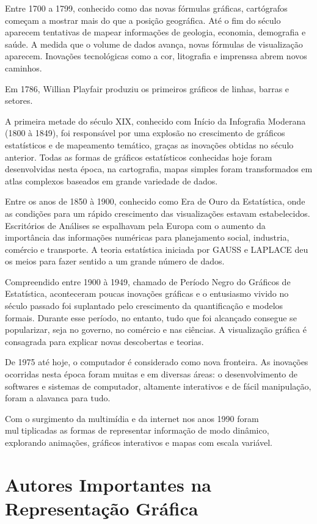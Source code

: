 \documentclass[
  letterpaper,
  DIV=11,
  numbers=noendperiod]{scrreprt}
\begin{document}
Entre 1700 a 1799, conhecido como das novas fórmulas gráficas,
cartógrafos começam a mostrar mais do que a posição geográfica. Até o
fim do século aparecem tentativas de mapear informações de geologia,
economia, demografia e saúde. A medida que o volume de dados avança,
novas fórmulas de visualização aparecem. Inovações tecnológicas como a
cor, litografia e imprenssa abrem novos caminhos.

Em 1786, Willian Playfair produziu os primeiros gráficos de linhas,
barras e setores.

A primeira metade do século XIX, conhecido com Início da Infografia
Moderana (1800 à 1849), foi responsável por uma explosão no crescimento
de gráficos estatísticos e de mapeamento temático, graças as inovações
obtidas no século anterior. Todas as formas de gráficos estatísticos
conhecidas hoje foram desenvolvidas nesta época, na cartografia, mapas
simples foram transformados em atlas complexos baseados em grande
variedade de dados.

Entre os anos de 1850 à 1900, conhecido como Era de Ouro da Estatística,
onde as condições para um rápido crescimento das visualizações estavam
estabelecidos. Escritórios de Análises se espalhavam pela Europa com o
aumento da importância das informações numéricas para planejamento
social, industria, comércio e transporte. A teoria estatística iniciada
por GAUSS e LAPLACE deu os meios para fazer sentido a um grande número
de dados.

Compreendido entre 1900 à 1949, chamado de Período Negro do Gráficos de
Estatística, aconteceram poucas inovações gráficas e o entusiasmo vivido
no século passado foi suplantado pelo crescimento da quantificação e
modelos formais. Durante esse período, no entanto, tudo que foi
alcançado consegue se popularizar, seja no governo, no comércio e nas
ciências. A visualização gráfica é consagrada para explicar novas
descobertas e teorias.

De 1975 até hoje, o computador é considerado como nova fronteira. As
inovações ocorridas nesta época foram muitas e em diversas áreas: o
desenvolvimento de softwares e sistemas de computador, altamente
interativos e de fácil manipulação, foram a alavanca para tudo.

Com o surgimento da multimídia e da internet nos anos 1990 foram
multiplicadas as formas de representar informação de modo dinâmico,
explorando animações, gráficos interativos e mapas com escala variável.

\hypertarget{autores-importantes-na-representauxe7uxe3o-gruxe1fica}{%
\section{Autores Importantes na Representação
Gráfica}\label{autores-importantes-na-representauxe7uxe3o-gruxe1fica}}
\end{document}

